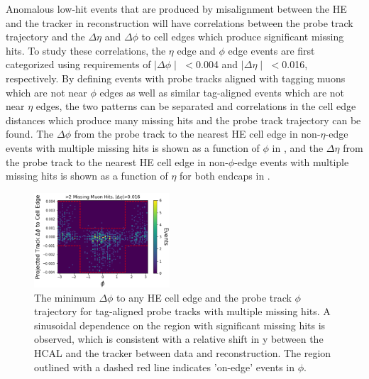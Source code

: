Anomalous low-hit events that are produced by misalignment between the HE and the tracker in reconstruction will have correlations between the probe track trajectory and the $\Delta\eta$ and $\Delta\phi$ to cell edges which produce significant missing hits. 
To study these correlations, the $\eta$ edge and $\phi$ edge events are first categorized using requirements of $\mid\Delta\phi\mid$ $<$0.004 and $\mid\Delta\eta\mid$ $<$0.016, respectively. 
By defining events with probe tracks aligned with tagging muons which are not near $\phi$ edges as well as similar tag-aligned events which are not near $\eta$ edges, the two patterns can be separated and correlations in the cell edge distances which produce many missing hits and the probe track trajectory can be found. 
The $\Delta\phi$ from the probe track to the nearest HE cell edge in non-$\eta$-edge events with multiple missing hits is shown as a function of $\phi$ in , and the $\Delta\eta$ from the probe track to the nearest HE cell edge in non-$\phi$-edge events with multiple missing hits is shown as a function of $\eta$ for both endcaps in .

\begin{figure}[htpb]
    \includegraphics[width=0.45\textwidth]{figures/phiEdgeEventsData.png} 
    \centering
	\caption[$\phi$ edge correlations in missing HCAL muon hits.]{The minimum $\Delta\phi$ to any HE cell edge and the probe track $\phi$ trajectory for tag-aligned probe tracks with multiple missing hits. A sinusoidal dependence on the region with significant missing hits is observed, which is consistent with a relative shift in y between the HCAL and the tracker between data and reconstruction. The region outlined with a dashed red line indicates 'on-edge' events in $\phi$.}
    \label{fig:phiEdgeCorr}
\end{figure}

